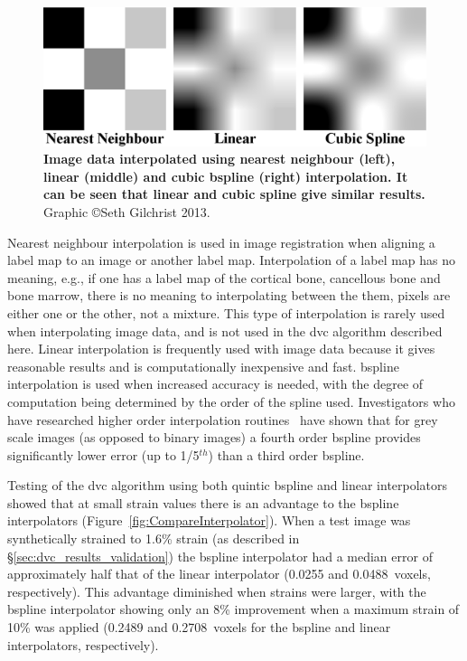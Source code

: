 \begin{figure}
\centering
\includegraphics[width=\linewidth]{./appendixDvc/figures/Interpolations}
\caption[Interpolation of image data]{\textbf{Image data interpolated using nearest neighbour (left), linear (middle) and cubic \acs{bspline} (right) interpolation. It can be seen that linear and cubic spline give similar results.} Graphic \copyright Seth Gilchrist 2013.}
\label{fig:Interpolations}
\end{figure}

Nearest neighbour interpolation is used in image registration when aligning a label map to an image or another label map.
Interpolation of a label map has no meaning, e.g., if one has a label map of the cortical bone, cancellous bone and bone marrow, there is no meaning to interpolating between the them, pixels are either one or the other, not a mixture.
This type of interpolation is rarely used when interpolating image data, and is not used in the \ac{dvc} algorithm described here.
Linear interpolation is frequently used with image data because it gives reasonable results and is computationally inexpensive and fast.
\ac{bspline} interpolation is used when increased accuracy is needed, with the degree of computation being determined by the order of the spline used.
Investigators who have researched higher order interpolation routines~\citep{schreier_systematic_2000} have shown that for grey scale images (as opposed to binary images) a fourth order \ac{bspline} provides significantly lower error (up to 1/5$^{th}$) than a third order \ac{bspline}.

Testing of the \ac{dvc} algorithm using both quintic \ac{bspline} and linear interpolators showed that at small strain values there is an advantage to the \ac{bspline} interpolators (Figure~\ref{fig:CompareInterpolator}).
When a test image was synthetically strained to 1.6\% strain (as described in \S\ref{sec:dvc_results_validation}) the \ac{bspline} interpolator had a median error of approximately half that of the linear interpolator (0.0255 and 0.0488~voxels, respectively).
This advantage diminished when strains were larger, with the \ac{bspline} interpolator showing only an 8\% improvement when a maximum strain of 10\% was applied (0.2489 and 0.2708~voxels for the \ac{bspline} and linear interpolators, respectively).

